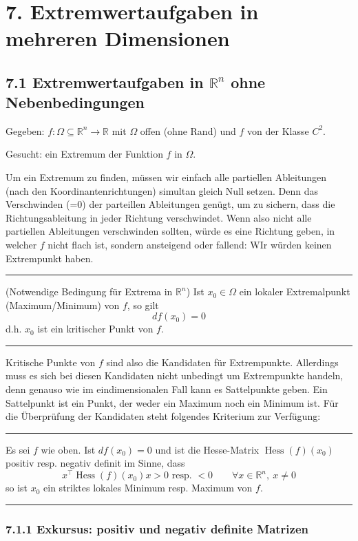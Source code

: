 \documentclass[a4paper,landscape,8pt]{extarticle}
\newcommand{\R}{\mathbb{R}}
\newcommand{\sep}{\vspace{5pt}\noindent\hrule\vspace{5pt}}
\DeclareMathOperator{\Hess}{Hess}
\renewcommand*{\newpage}{ \ }
\begin{document}
\begin{multicols*}{4}
\newpage

\section{7. Extremwertaufgaben in mehreren Dimensionen}

\subsection{7.1 Extremwertaufgaben in $\R^n$ ohne Nebenbedingungen}

Gegeben: $f\colon\Omega\subseteq\R^n\to\R$ mit $\Omega$ offen (ohne Rand) und
$f$ von der Klasse $C^2$.

Gesucht: ein Extremum der Funktion $f$ in $\Omega$. 

Um ein Extremum zu finden, müssen wir einfach alle partiellen Ableitungen (nach
den Koordinantenrichtungen) simultan gleich Null setzen. Denn das Verschwinden
(=0) der parteillen Ableitungen genügt, um zu sichern, dass die
Richtungsableitung in jeder Richtung verschwindet. Wenn also nicht alle
partiellen Ableitungen verschwinden sollten, würde es eine Richtung geben, in
welcher $f$ nicht flach ist, sondern ansteigend oder fallend: WIr würden keinen
Extrempunkt haben.

\sep

\Satz (Notwendige Bedingung für Extrema in $\R^n$) Ist $x_0\in\Omega$ ein
lokaler Extremalpunkt (Maximum/Minimum) von $f$, so gilt
\[
df(x_0) = 0
\]
d.h. $x_0$ ist ein kritischer Punkt von $f$.

\sep

Kritische Punkte von $f$ sind also die Kandidaten für Extrempunkte. Allerdings
muss es sich bei diesen Kandidaten nicht unbedingt um Extrempunkte handeln, denn
genauso wie im eindimensionalen Fall kann es Sattelpunkte geben. Ein Sattelpunkt
ist ein Punkt, der weder ein Maximum noch ein Minimum ist. Für die Überprüfung
der Kandidaten steht folgendes Kriterium zur Verfügung:

\sep

\Satz Es sei $f$ wie oben. Ist $df(x_0)=0$ und ist die Hesse-Matrix
$\Hess(f)(x_0)$ positiv resp. negativ definit im Sinne, dass
\[
x^\top \Hess(f)(x_0) x > 0 \text{ resp. }<0 \qquad \forall x\in\R^n, \ x \neq 0
\]
so ist $x_0$ ein striktes lokales Minimum resp. Maximum von $f$.

\sep

\subsubsection{7.1.1 Exkursus: positiv und negativ definite Matrizen}


\end{multicols*}
\end{document}

